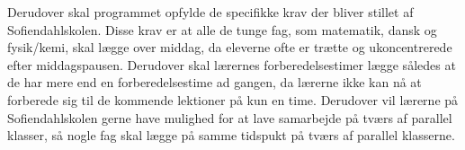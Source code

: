 Derudover skal programmet opfylde de specifikke krav der bliver stillet af Sofiendahlskolen. Disse krav er at alle de tunge fag, som matematik, dansk og fysik/kemi, skal lægge over middag, da eleverne ofte er trætte og ukoncentrerede efter middagspausen. Derudover skal lærernes forberedelsestimer lægge således at de har mere end en forberedelsestime ad gangen, da lærerne ikke kan nå at forberede sig til de kommende lektioner på kun en time. Derudover vil lærerne på Sofiendahlskolen gerne have mulighed for at lave samarbejde på tværs af parallel klasser, så nogle fag skal lægge på samme tidspukt på tværs af parallel klasserne\cite{interview}.